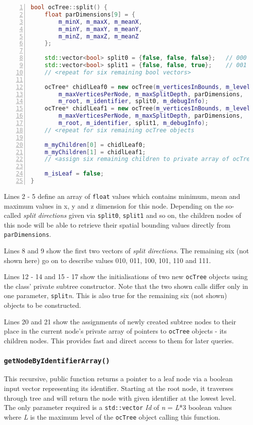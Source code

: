 \begin{minipage}{\linewidth}
\begin{lstlisting}[language=C++,numberstyle=\zebra{black!5}{white}{},numbers=left,xleftmargin=2em,tabsize=3]
bool ocTree::split() {
	float parDimensions[9] = {
		m_minX,	m_maxX,	m_meanX,
		m_minY,	m_maxY, m_meanY,
		m_minZ, m_maxZ, m_meanZ
	};

	std::vector<bool> split0 = {false, false, false};	// 000
	std::vector<bool> split1 = {false, false, true};	// 001
	// <repeat for six remaining bool vectors>

	ocTree* chidlLeaf0 = new ocTree(m_verticesInBounds, m_level,
		m_maxVerticesPerNode, m_maxSplitDepth, parDimensions,
		m_root, m_identifier, split0, m_debugInfo);
	ocTree* chidlLeaf1 = new ocTree(m_verticesInBounds, m_level,
		m_maxVerticesPerNode, m_maxSplitDepth, parDimensions,
		m_root, m_identifier, split1, m_debugInfo);
	// <repeat for six remaining ocTree objects

	m_myChildren[0] = chidlLeaf0;
	m_myChildren[1] = chidlLeaf1;
	// <assign six remaining children to private array of ocTree nodes>

	m_isLeaf = false;
}
\end{lstlisting}
\end{minipage}

Lines 2 - 5 define an array of \texttt{float} values which contains minimum, mean and maximum values in x, y and z dimension for this node. Depending on the so-called \textit{split directions} given via \texttt{split0}, \texttt{split1} and so on, the children nodes of this node will be able to retrieve their spatial bounding values directly from \texttt{parDimensions}.

Lines 8 and 9 show the first two vectors of \textit{split directions}. The remaining six (not shown here) go on to describe values 010, 011, 100, 101, 110 and 111.

Lines 12 - 14 and 15 - 17 show the initialisations of two new \texttt{ocTree} objects using the class' private subtree constructor. Note that the two shown calls differ only in one parameter, \texttt{split}\textit{n}. This is also true for the remaining six (not shown) objects to be constructed.

Lines 20 and 21 show the assignments of newly created subtree nodes to their place in the current node's private array of pointers to \texttt{ocTree} objects - its children nodes. This provides fast and direct access to them for later queries. 

	\subsubsection{\texttt{getNodeByIdentifierArray()}}
	\label{set:getNodeByIdentifierArray}
This recursive, public function returns a pointer to a leaf node via a boolean input vector representing its identifier. Starting at the root node, it traverses through tree and will return the node with given identifier at the lowest level. The only parameter required is a \texttt{std::vector} \textit{Id} of \textit{n} = \textit{L}*3 boolean values where \textit{L} is the maximum level of the \texttt{ocTree} object calling this function.

